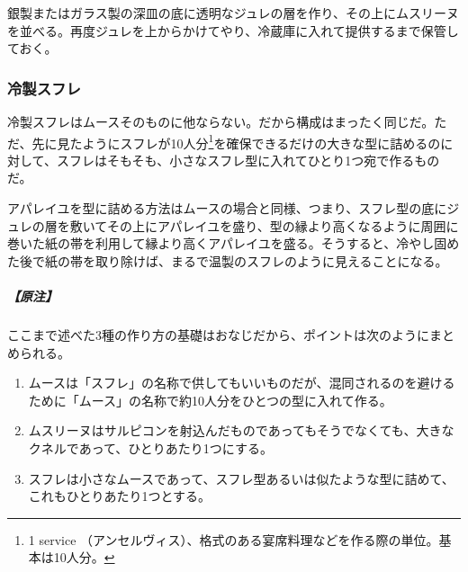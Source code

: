 \begin{recette}
銀製またはガラス製の深皿の底に透明なジュレの層を作り、その上にムスリーヌを並べる。再度ジュレを上からかけてやり、冷蔵庫に入れて提供するまで保管しておく。

\hypertarget{souffles-froids}{%
\subsubsection{冷製スフレ}\label{souffles-froids}}



冷製スフレはムースそのものに他ならない。だから構成はまったく同じだ。ただ、先に見たようにスフレが10人分\footnote{1
  service
  （アンセルヴィス）、格式のある宴席料理などを作る際の単位。基本は10人分。}を確保できるだけの大きな型に詰めるのに対して、スフレはそもそも、小さなスフレ型に入れてひとり1つ宛で作るものだ。

アパレイユを型に詰める方法はムースの場合と同様、つまり、スフレ型の底にジュレの層を敷いてその上にアパレイユを盛り、型の縁より高くなるように周囲に巻いた紙の帯を利用して縁より高くアパレイユを盛る。そうすると、冷やし固めた後で紙の帯を取り除けば、まるで温製のスフレのように見えることになる。

\hypertarget{nota-souffles-froids}{%
\subparagraph{【原注】}\label{nota-souffles-froids}}

ここまで述べた3種の作り方の基礎はおなじだから、ポイントは次のようにまとめられる。

\begin{enumerate}
\def\labelenumi{\arabic{enumi}.}
\item
  ムースは「スフレ」の名称で供してもいいものだが、混同されるのを避けるために「ムース」の名称で約10人分をひとつの型に入れて作る。
\item
  ムスリーヌはサルピコンを射込んだものであってもそうでなくても、大きなクネルであって、ひとりあたり1つにする。
\item
  スフレは小さなムースであって、スフレ型あるいは似たような型に詰めて、これもひとりあたり1つとする。
\end{enumerate}
\end{recette}
